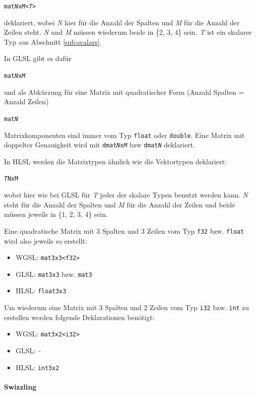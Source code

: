 \documentclass[oneside]{ausarbeitung}
\begin{document}
\texttt{mat\textit{N}x\textit{M}<\textit{T}>}

deklariert, wobei \textit{N} hier für die Anzahl der Spalten und \textit{M} für die Anzahl der Zeilen steht. \textit{N} und \textit{M} müssen wiederum beide in \{2, 3, 4\} sein. \textit{T} ist ein skalarer Typ aus Abschnitt \ref{sub:scalars}.

In GLSL gibt es dafür

\texttt{mat\textit{N}x\textit{M}}

und als Abkürzung für eine Matrix mit quadratischer Form (Anzahl Spalten = Anzahl Zeilen)

\texttt{mat\textit{N}}

Matrixkomponenten sind immer vom Typ \texttt{float} oder \texttt{double}. Eine Matrix mit doppelter Genauigkeit wird mit \texttt{dmat\textit{N}x\textit{M}} bzw \texttt{dmat\textit{N}} deklariert.

In HLSL werden die Matrixtypen ähnlich wie die Vektortypen deklariert:

\texttt{\textit{T}\texttt{N}x\texttt{M}}

wobei hier wie bei GLSL für \textit{T} jeder der skalare Typen benutzt werden kann. \textit{N} steht für die Anzahl der Spalten und \textit{M} für die Anzahl der Zeilen und beide müssen jeweils in \{1, 2, 3, 4\} sein.

Eine quadratische Matrix mit 3 Spalten und 3 Zeilen vom Typ \texttt{f32} bzw. \texttt{float} wird also jeweils so erstellt:
\begin{itemize}
 \item WGSL: \texttt{mat3x3<f32>}
 \item GLSL: \texttt{mat3x3} bzw. \texttt{mat3}
 \item HLSL: \texttt{float3x3}
\end{itemize}

Um wiederum eine Matrix mit 3 Spalten und 2 Zeilen vom Typ \texttt{i32} bzw. \texttt{int} zu erstellen werden folgende Deklarationen benötigt:

\begin{itemize}
 \item WGSL: \texttt{mat3x2<i32>}
 \item GLSL: \textit{-}
 \item HLSL: \texttt{int3x2}
\end{itemize}

\paragraph{Swizzling} \
\end{document}
